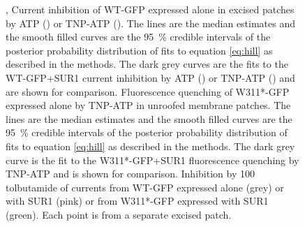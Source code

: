 \begin{figure}[hbtp]
{	,  Current inhibition of WT-GFP expressed alone in excised patches by ATP () or TNP-ATP ().
	The lines are the median estimates and the smooth filled curves are the \SI{95}{\percent} credible intervals of the posterior probability distribution of fits to equation \ref{eq:hill} as described in the methods.
	The dark grey curves are the fits to the WT-GFP+SUR1 current inhibition by ATP () or TNP-ATP () and are shown for comparison.
	 Fluorescence quenching of W311*-GFP expressed alone by TNP-ATP in unroofed membrane patches.
	The lines are the median estimates and the smooth filled curves are the \SI{95}{\percent} credible intervals of the posterior probability distribution of fits to equation \ref{eq:hill} as described in the methods.
	The dark grey curve is the fit to the W311*-GFP+SUR1 fluorescence quenching by TNP-ATP and is shown for comparison.
	 Inhibition by \SI{100}{\micro\Molar} tolbutamide of currents from WT-GFP expressed alone (grey) or with SUR1 (pink) or from W311*-GFP expressed with SUR1 (green).
	Each point is from a separate excised patch.
	}\label{ch6fig:no_sur}
\end{figure}

